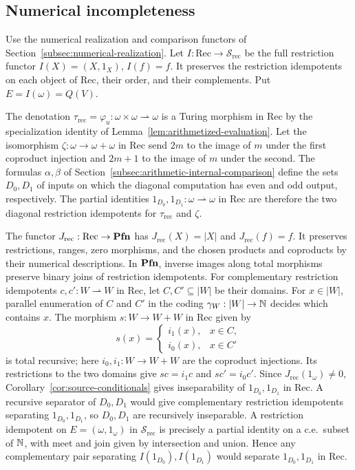 \subsection{Numerical incompleteness}
\label{sec:numerical-incompleteness}
\label{subsec:numerical-incompleteness}

Use the numerical realization and comparison functors of
Section~\ref{subsec:numerical-realization}. Let
$I:\mathrm{Rec}\to\mathscr S_{\mathrm{rec}}$ be the full restriction
functor $I(X)=(X,1_X)$, $I(f)=f$. It preserves the restriction
idempotents on each object of $\mathrm{Rec}$, their order, and their
complements. Put $E=I(\omega)=Q(V)$.

The denotation
$\tau_{\mathrm{rec}}=\varphi_u:\omega\times\omega\rightharpoonup\omega$
is a Turing morphism in $\mathrm{Rec}$ by the specialization identity
of Lemma~\ref{lem:arithmetized-evaluation}. Let the isomorphism
$\zeta:\omega\to\omega+\omega$ in $\mathrm{Rec}$ send $2m$ to
the image of $m$ under the first coproduct injection and $2m+1$
to the image of $m$ under the second. The formulas $\alpha,\beta$ of
Section~\ref{subsec:arithmetic-internal-comparison} define the sets
$D_0,D_1$ of inputs on which the diagonal computation has even and
odd output, respectively. The partial identities
$1_{D_0},1_{D_1}:\omega\rightharpoonup\omega$ in $\mathrm{Rec}$ are
therefore the two diagonal restriction idempotents for
$\tau_{\mathrm{rec}}$ and $\zeta$.

The functor $J_{\mathrm{rec}}:\mathrm{Rec}\to\mathbf{Pfn}$ has
$J_{\mathrm{rec}}(X)=|X|$ and $J_{\mathrm{rec}}(f)=f$.
It preserves restrictions, ranges, zero morphisms, and the chosen
products and coproducts by their numerical descriptions.
In $\mathbf{Pfn}$, inverse images along total morphisms preserve binary joins of restriction
idempotents.
For complementary restriction idempotents $c,c':W\rightharpoonup W$
in $\mathrm{Rec}$, let $C,C'\subseteq|W|$ be their domains. For
$x\in|W|$, parallel enumeration of $C$ and $C'$ in the coding
$\gamma_W:|W|\to\mathbb N$ decides which contains $x$. The morphism
$s:W\to W+W$ in $\mathrm{Rec}$
given by
\[
 s(x)=
 \begin{cases}
  i_1(x),&x\in C,\\
  i_0(x),&x\in C'
 \end{cases}
\]
is total recursive; here $i_0,i_1:W\to W+W$ are the coproduct
injections. Its restrictions to the two domains give
$sc=i_1c$ and $sc'=i_0c'$. Since $J_{\mathrm{rec}}(1_\omega)\ne0$,
Corollary~\ref{cor:source-conditionals} gives inseparability
of $1_{D_0},1_{D_1}$ in $\mathrm{Rec}$. A recursive separator of $D_0,D_1$ would
give complementary restriction idempotents separating $1_{D_0},1_{D_1}$, so
$D_0,D_1$ are recursively inseparable. A restriction idempotent on
$E=(\omega,1_\omega)$ in $\mathscr S_{\mathrm{rec}}$ is precisely
a partial identity on a c.e.\ subset of $\mathbb N$, with meet and join
given by intersection and union. Hence any complementary pair
separating $I(1_{D_0}),I(1_{D_1})$ would separate $1_{D_0},1_{D_1}$ in $\mathrm{Rec}$.

